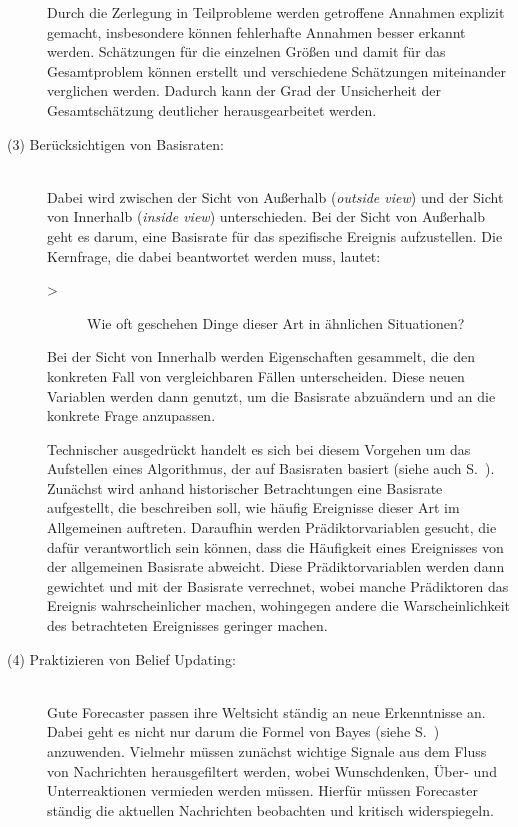 \begin{description}
Durch die Zerlegung in Teilprobleme werden getroffene Annahmen explizit gemacht, insbesondere können
fehlerhafte Annahmen besser erkannt werden. Schätzungen für die einzelnen Größen und damit für das Gesamtproblem
können erstellt und verschiedene Schätzungen miteinander verglichen werden. Dadurch kann der Grad der Unsicherheit
der Gesamtschätzung deutlicher herausgearbeitet werden.

\item[(3) Berücksichtigen von Basisraten:] \hfill \\
Dabei wird zwischen der Sicht von Außerhalb (\emph{outside view}) und der Sicht von Innerhalb (\emph{inside view})
unterschieden. Bei der Sicht von Außerhalb geht es darum, eine Basisrate für das spezifische Ereignis aufzustellen.
Die Kernfrage, die dabei beantwortet werden muss, lautet:

\begin{description}
\item[>] Wie oft geschehen Dinge dieser Art in ähnlichen Situationen?
\end{description}

Bei der Sicht von Innerhalb werden Eigenschaften gesammelt, die den konkreten Fall von vergleichbaren Fällen
unterscheiden. Diese neuen Variablen werden dann genutzt, um die Basisrate abzuändern und an die konkrete
Frage anzupassen.

Technischer ausgedrückt handelt es sich bei diesem Vorgehen um das Aufstellen eines Algorithmus, der auf Basisraten
basiert (siehe auch S.~\xcom). Zunächst wird anhand historischer Betrachtungen eine Basisrate aufgestellt, die
beschreiben soll, wie häufig Ereignisse dieser Art im Allgemeinen auftreten. Daraufhin werden Prädiktorvariablen gesucht, die
dafür verantwortlich sein können, dass die Häufigkeit eines Ereignisses von der allgemeinen Basisrate abweicht. Diese
Prädiktorvariablen werden dann gewichtet und mit der Basisrate verrechnet, wobei manche Prädiktoren das Ereignis wahrscheinlicher
machen, wohingegen andere die Warscheinlichkeit des betrachteten Ereignisses geringer machen.

\item[(4) Praktizieren von Belief Updating:] \hfill \\
Gute Forecaster passen ihre Weltsicht ständig an neue Erkenntnisse an. Dabei geht es nicht nur darum die Formel von Bayes
(siehe S.~\xcom) anzuwenden. Vielmehr müssen zunächst wichtige Signale aus dem Fluss von Nachrichten herausgefiltert werden, wobei
Wunschdenken, Über- und Unterreaktionen vermieden werden müssen. Hierfür müssen Forecaster ständig die aktuellen Nachrichten beobachten 
und kritisch widerspiegeln.


\end{description}
